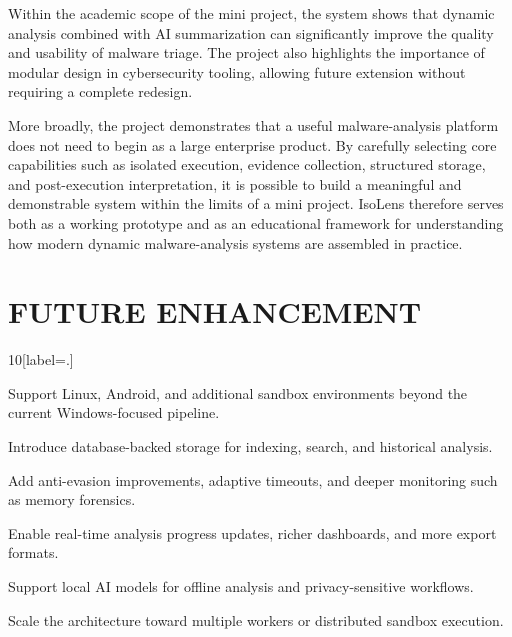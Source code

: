 \documentclass[a4paper,12pt,oneside]{report}
\begin{document}
\par

\par

Within the academic scope of the mini project, the system shows that dynamic analysis combined with AI summarization can significantly improve the quality and usability of malware triage. The project also highlights the importance of modular design in cybersecurity tooling, allowing future extension without requiring a complete redesign.

\par

\par

More broadly, the project demonstrates that a useful malware-analysis platform does not need to begin as a large enterprise product. By carefully selecting core capabilities such as isolated execution, evidence collection, structured storage, and post-execution interpretation, it is possible to build a meaningful and demonstrable system within the limits of a mini project. IsoLens therefore serves both as a working prototype and as an educational framework for understanding how modern dynamic malware-analysis systems are assembled in practice.

\section{FUTURE ENHANCEMENT}
\noindent
\begin{thebibliography}{10}[label=\arabic*.]
\item Support Linux, Android, and additional sandbox environments beyond the current Windows-focused pipeline.
\item Introduce database-backed storage for indexing, search, and historical analysis.
\item Add anti-evasion improvements, adaptive timeouts, and deeper monitoring such as memory forensics.
\item Enable real-time analysis progress updates, richer dashboards, and more export formats.
\item Support local AI models for offline analysis and privacy-sensitive workflows.
\item Scale the architecture toward multiple workers or distributed sandbox execution.
\end{thebibliography}

\newpage
\end{document}
